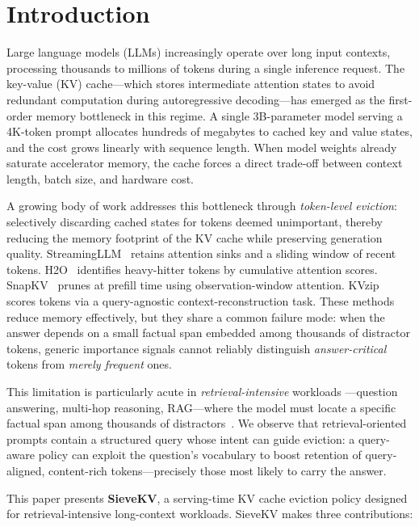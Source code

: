 \documentclass[runningheads]{llncs}
\begin{document}
\section{Introduction}
\label{sec:intro}

Large language models (LLMs) increasingly operate over long input contexts,
processing thousands to millions of tokens during a single inference request.
The key-value (KV) cache---which stores intermediate attention states to avoid
redundant computation during autoregressive decoding---has emerged as the
first-order memory bottleneck in this regime.
A single 3B-parameter model serving a 4K-token prompt allocates hundreds of
megabytes to cached key and value states, and the cost grows linearly with
sequence length.
When model weights already saturate accelerator memory, the cache forces a
direct trade-off between context length, batch size, and hardware cost.

A growing body of work addresses this bottleneck through \emph{token-level
eviction}: selectively discarding cached states for tokens deemed unimportant,
thereby reducing the memory footprint of the KV cache while preserving
generation quality.
StreamingLLM~\cite{xiao2023streamingllm} retains attention sinks and a sliding
window of recent tokens.
H2O~\cite{zhang2023h2o} identifies heavy-hitter tokens by cumulative attention
scores.
SnapKV~\cite{li2024snapkv} prunes at prefill time using observation-window
attention.
KVzip~\cite{he2025kvzip} scores tokens via a query-agnostic context-reconstruction
task.
These methods reduce memory effectively, but they share a common failure mode:
when the answer depends on a small factual span embedded among thousands of
distractor tokens, generic importance signals cannot reliably distinguish
\emph{answer-critical} tokens from \emph{merely frequent} ones.

This limitation is particularly acute in \emph{retrieval-intensive} workloads
---question answering, multi-hop reasoning, RAG---where the model must locate
a specific factual span among thousands of distractors~\cite{hsieh2024ruler,modarressi2025nolima}.
We observe that retrieval-oriented prompts contain a structured query whose
intent can guide eviction: a query-aware policy can exploit the question's
vocabulary to boost retention of query-aligned, content-rich tokens---precisely
those most likely to carry the answer.

This paper presents \textbf{SieveKV}, a serving-time KV cache eviction
policy designed for retrieval-intensive long-context workloads.
SieveKV makes three contributions:
\end{document}
